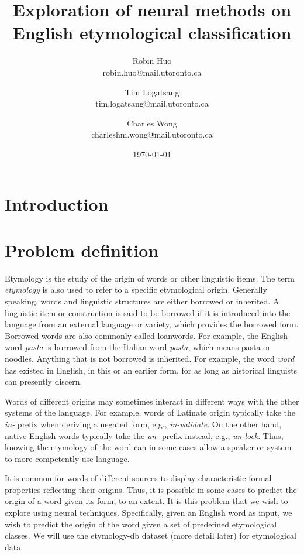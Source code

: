 \documentclass[11pt]{article}
\title{\vspace{-3cm}Exploration of neural methods on English etymological classification}
\date{\today}
\author{Robin Huo \\ robin.huo@mail.utoronto.ca
\and Tim Logatsang \\ tim.logatsang@mail.utoronto.ca
\and Charles Wong \\ charleshm.wong@mail.utoronto.ca}
\begin{document}
	\maketitle
	
	\section{Introduction}
	
	\section{Problem definition}        %
	Etymology is the study of the origin of words or other linguistic items.
	The term \textit{etymology} is also used to refer to a specific etymological origin.
	Generally speaking, words and linguistic structures are either borrowed or inherited.
	A linguistic item or construction is said to be borrowed if it is introduced into the language from an external language or variety, which provides the borrowed form.
	Borrowed words are also commonly called loanwords.
	For example, the English word \textit{pasta} is borrowed from the Italian word \textit{pasta}, which means pasta or noodles.
	Anything that is not borrowed is inherited.
	For example, the word \textit{word} has existed in English, in this or an earlier form, for as long as historical linguists can presently discern.
	
	Words of different origins may sometimes interact in different ways with the other systems of the language.
	For example, words of Latinate origin typically take the \textit{in-} prefix when deriving a negated form, e.g., \textit{in-validate}.
	On the other hand, native English words typically take the \textit{un-} prefix instead, e.g., \textit{un-lock}.
	Thus, knowing the etymology of the word can in some cases allow a speaker or system to more competently use language.
	
	It is common for words of different sources to display characteristic formal properties reflecting their origins.
	Thus, it is possible in some cases to predict the origin of a word given its form, to an extent.
	It is this problem that we wish to explore using neural techniques.
	Specifically, given an English word as input, we wish to predict the origin of the word given a set of predefined etymological classes.
	We will use the etymology-db \cite{etymologydb} dataset (more detail later) for etymological data.
	
\end{document}
